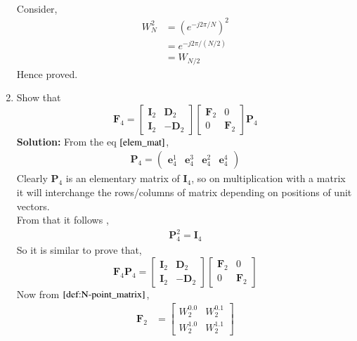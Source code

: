 \documentclass[journal,12pt,twocolumn]{IEEEtran}
\newcommand{\solution}{\noindent \textbf{Solution: }}
\providecommand{\brak}[1]{\ensuremath{\left(#1\right)}}
\let\vec\mathbf
\numberwithin{equation}{section}
\renewcommand\thesection{\arabic{section}}
\newcommand{\myvec}[1]{\ensuremath{\begin{pmatrix}#1\end{pmatrix}}}
\begin{document}
\begin{enumerate}[label=\arabic*.,ref=\thesection.\theenumi]
\begin{align}
		\end{align}
	Consider,
		\begin{align}
			W_{N}^{2} &= \brak{e^{-j2\pi/N}}^2 \\
				  &= e^{-j2\pi/\brak{N/2}} \\
				  &= W_{N/2}\label{result}
		\end{align}
Hence proved.\\
  \item Show that 
\begin{equation}
	\vec{F}_{4}=
\begin{bmatrix}
	\vec{I}_{2} & \vec{D}_{2} \\
\vec{I}_{2} & -\vec{D}_{2}
\end{bmatrix}
\begin{bmatrix}
\vec{F}_{2} & 0 \\
0 & \vec{F}_{2}
\end{bmatrix}
	\vec{P}_{4}
\end{equation}
  \solution From the eq $\eqref{elem_mat}$,
		\begin{align}
                  \vec{P}_4 = \myvec{\vec{e}_4^{1} &\vec{e}_4^{3} &\vec{e}_4^{2} &\vec{e}_4^{4} }
                \end{align}
Clearly $\vec{P}_4$ is an elementary matrix of $\vec{I}_{4}$, so on multiplication with a matrix it will interchange the rows/columns of matrix depending on positions of unit vectors.\\
From that it follows ,
	  \begin{align}
		  \vec{P}_4^2 = \vec{I}_4
	  \end{align}
So it is similar to prove that, 
  \begin{equation} 
	  \vec{F}_{4}\vec{P}_{4}=
\begin{bmatrix}
        \vec{I}_{2} & \vec{D}_{2} \\
\vec{I}_{2} & -\vec{D}_{2}
\end{bmatrix}
\begin{bmatrix}
\vec{F}_{2} & 0 \\
0 & \vec{F}_{2}   
\end{bmatrix}                    
\end{equation}
 Now from $\eqref{def:N-point_matrix}$,
  \begin{align}
	  \vec{F}_{2} &= 
	  \begin{bmatrix}
		  W_2^{0.0} & W_2^{0.1} \\
		  W_2^{1.0} & W_2^{1.1}
	  \end{bmatrix} \\

\end{align}
\end{enumerate}
\end{document}
